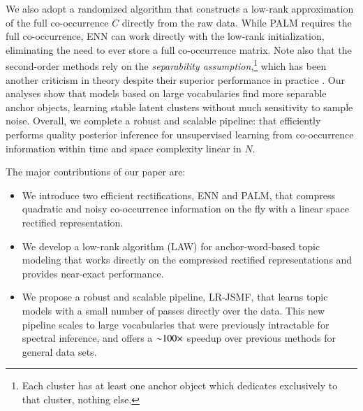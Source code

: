 We also adopt a randomized algorithm that constructs a low\hyp{}rank
approximation of the full co\hyp{}occurrence $C$ directly from the raw data.
While PALM requires the full co\hyp{}occurrence, ENN can work directly with the
low\hyp{}rank initialization, eliminating the need to ever store a full 
co\hyp{}occurrence matrix. Note also that the second\hyp{}order methods rely on
the \textit{separability assumption},\footnote{Each cluster has at least one
anchor object which dedicates exclusively to that cluster, nothing else.} which
has been another criticism in theory despite their superior performance in
practice \cite{moontae2017from}. Our analyses show that models based on large
vocabularies find more separable anchor objects, learning stable latent clusters
without much sensitivity to sample noise. Overall, we complete a robust and
scalable pipeline: that efficiently performs quality posterior inference for
unsupervised learning from co\hyp{}occurrence information within time and space
complexity linear in $N$. 

The major contributions of our paper are:
\begin{itemize}[leftmargin=*]
    \item We introduce two efficient rectifications, ENN and PALM, that compress
    quadratic and noisy co\hyp{}occurrence information on the fly with a linear
    space rectified representation. 
    \item We develop a low\hyp{}rank algorithm (LAW) for 
    anchor\hyp{}word\hyp{}based topic modeling that works directly on the
    compressed rectified representations and provides near\hyp{}exact
    performance.
    \item We propose a robust and scalable pipeline, LR\hyp{}JSMF, that learns
    topic models with a small number of passes directly over the data.  This new
    pipeline scales to large vocabularies that were previously intractable for
    spectral inference, and offers a $\mathbf{\sim}100\mathbin{\times}$ speedup over
    previous methods for general data sets.
\end{itemize} 